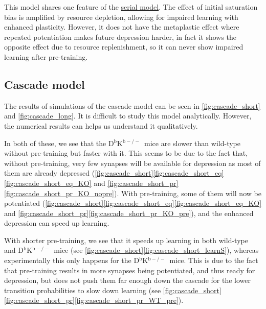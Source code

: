 \documentclass[12pt]{article}
\newcommand{\KO}{D$^\mathrm{b}$K$^{\mathrm{b}-/-}$}
\begin{document}
This model shares one feature of the \hyperref[sec:multistate]{serial model}.
The effect of initial saturation bias is amplified by resource depletion, allowing for impaired learning with enhanced plasticity.
However, it does not have the metaplastic effect where repeated potentiation makes future depression harder, in fact it shows the opposite effect due to resource replenishment, so it can never show impaired learning after pre-training.



\subsection{Cascade model}\label{sec:cascade}





The results of simulations of the cascade model can be seen in \autoref{fig:cascade_short} and \autoref{fig:cascade_long}.
It is difficult to study this model analytically.
However, the numerical results can helps us understand it qualitatively.

In both of these, we see that the \KO\ mice are slower than wild-type without pre-training but faster with it.
This seems to be due to the fact that, without pre-training, very few synapses will be available for depression as most of them are already depressed (\autoref{fig:cascade_short}\ref{fig:cascade_short_eq}\ref{fig:cascade_short_eq_KO} and \ref{fig:cascade_short_pr}\ref{fig:cascade_short_pr_KO_nopre}).
With pre-training, some of them will now be potentiated (\autoref{fig:cascade_short}\ref{fig:cascade_short_eq}\ref{fig:cascade_short_eq_KO} and \ref{fig:cascade_short_pr}\ref{fig:cascade_short_pr_KO_pre}), and the enhanced depression can speed up learning.

With shorter pre-training, we see that it speeds up learning in both wild-type and \KO\ mice (see \autoref{fig:cascade_short}\ref{fig:cascade_short_learnS}), whereas experimentally this only happens for the \KO\ mice.
This is due to the fact that pre-training results in more synapses being potentiated, and thus ready for depression, but does not push them far enough down the cascade for the lower transition probabilities to slow down learning (see \autoref{fig:cascade_short}\ref{fig:cascade_short_pr}\ref{fig:cascade_short_pr_WT_pre}).
\end{document}
